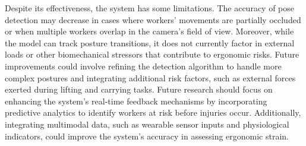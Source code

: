 \documentclass[11pt]{article}
\begin{document}






Despite its effectiveness, the system has some limitations. The accuracy of pose detection may decrease in cases where workers' movements are partially occluded or when multiple workers overlap in the camera’s field of view. Moreover, while the model can track posture transitions, it does not currently factor in external loads or other biomechanical stressors that contribute to ergonomic risks. Future improvements could involve refining the detection algorithm to handle more complex postures and integrating additional risk factors, such as external forces exerted during lifting and carrying tasks. Future research should focus on enhancing the system’s real-time feedback mechanisms by incorporating predictive analytics to identify workers at risk before injuries occur. Additionally, integrating multimodal data, such as wearable sensor inputs and physiological indicators, could improve the system’s accuracy in assessing ergonomic strain. 



\end{document}
